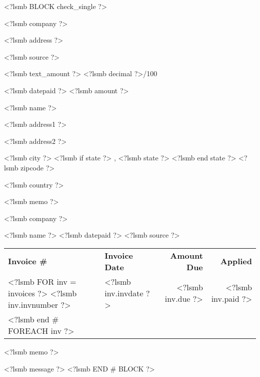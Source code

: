 <?lsmb BLOCK check_single ?>
\parbox[t]{12cm}{
  <?lsmb company ?>

  <?lsmb address ?>}
\hfill
\parbox[t]{6cm}{\hfill <?lsmb source ?>}

\vspace*{0.6cm}

<?lsmb text_amount ?> \dotfill <?lsmb decimal ?>/100 \makebox[0.5cm]{\hfill}

\vspace{0.5cm}

\hfill <?lsmb datepaid ?> \makebox[2cm]{\hfill} <?lsmb amount ?>


\vspace{0.5cm}

<?lsmb name ?>

<?lsmb address1 ?>

<?lsmb address2 ?>

<?lsmb city ?>
<?lsmb if state ?>
\hspace{-0.1cm}, <?lsmb state ?>
<?lsmb end state ?>
<?lsmb zipcode ?>

<?lsmb country ?>

\vspace{1.8cm}

<?lsmb memo ?>

\vspace{0.8cm}

<?lsmb company ?>

\vspace{0.5cm}

<?lsmb name ?> \hfill <?lsmb datepaid ?> \hfill <?lsmb source ?>

\vspace{0.5cm}
\begin{tabularx}{\textwidth}{lXrr@{}}
\textbf{Invoice \#} & \textbf{Invoice Date}
  & \textbf{Amount Due} & \textbf{Applied} \\
<?lsmb FOR inv = invoices ?>
<?lsmb inv.invnumber ?> & <?lsmb inv.invdate ?> \dotfill
  & <?lsmb inv.due ?> & <?lsmb inv.paid ?> \\
<?lsmb end # FOREACH inv ?>
\end{tabularx}

\vspace{1cm}

<?lsmb memo ?>

\vfill
<?lsmb message ?>
<?lsmb END # BLOCK ?>

